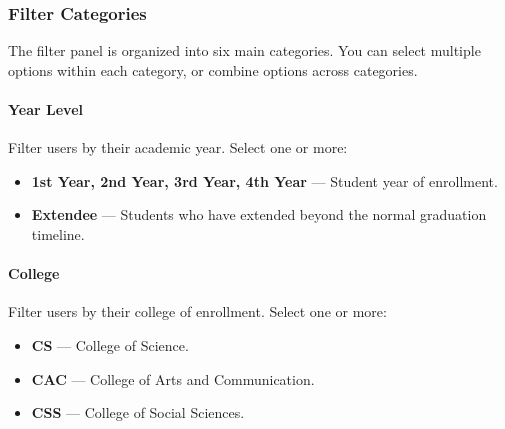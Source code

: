 \documentclass[12pt, a4paper]{article}
\begin{document}
\subsubsection{Filter Categories}
The filter panel is organized into six main categories. You can select multiple options within each category, or combine options across categories.

\paragraph{Year Level}
Filter users by their academic year. Select one or more:
\begin{itemize}[leftmargin=1.5em]
  \item \textbf{1st Year, 2nd Year, 3rd Year, 4th Year} — Student year of enrollment.
  \item \textbf{Extendee} — Students who have extended beyond the normal graduation timeline.
\end{itemize}

\paragraph{College}
Filter users by their college of enrollment. Select one or more:
\begin{itemize}[leftmargin=1.5em]
  \item \textbf{CS} — College of Science.
  \item \textbf{CAC} — College of Arts and Communication.
  \item \textbf{CSS} — College of Social Sciences.
\end{itemize}
\end{document}
